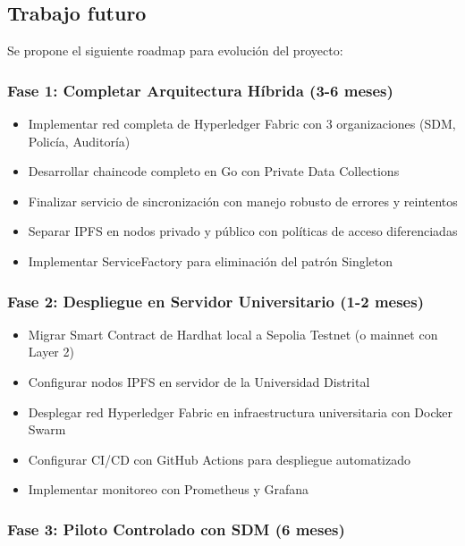 \subsection{Trabajo futuro}
Se propone el siguiente roadmap para evolución del proyecto:

\subsubsection{Fase 1: Completar Arquitectura Híbrida (3-6 meses)}

\begin{itemize}
    \item Implementar red completa de Hyperledger Fabric con 3 organizaciones (SDM, Policía, Auditoría)
    \item Desarrollar chaincode completo en Go con Private Data Collections
    \item Finalizar servicio de sincronización con manejo robusto de errores y reintentos
    \item Separar IPFS en nodos privado y público con políticas de acceso diferenciadas
    \item Implementar ServiceFactory para eliminación del patrón Singleton
\end{itemize}

\subsubsection{Fase 2: Despliegue en Servidor Universitario (1-2 meses)}

\begin{itemize}
    \item Migrar Smart Contract de Hardhat local a Sepolia Testnet (o mainnet con Layer 2)
    \item Configurar nodos IPFS en servidor de la Universidad Distrital
    \item Desplegar red Hyperledger Fabric en infraestructura universitaria con Docker Swarm
    \item Configurar CI/CD con GitHub Actions para despliegue automatizado
    \item Implementar monitoreo con Prometheus y Grafana
\end{itemize}

\subsubsection{Fase 3: Piloto Controlado con SDM (6 meses)}

